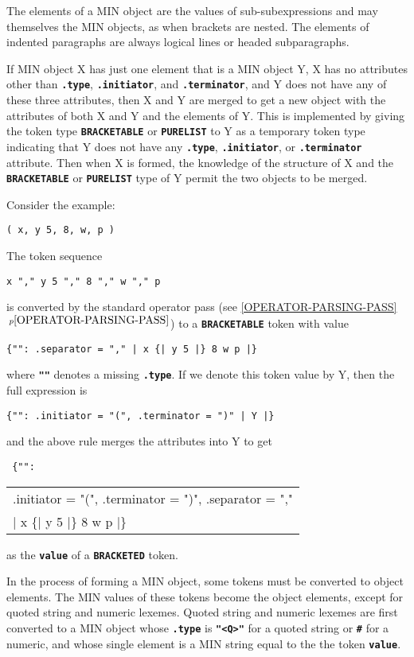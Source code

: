 \documentclass[12pt]{article}
\newcommand{\TT}[1]{{\tt \bfseries #1}}
\newcommand{\itemref}[1]{\ref{#1}$\,^{p\pageref{#1}}$}
\begin{document}
The elements of a MIN object are the values of sub-subexpressions and
may themselves the MIN objects, as when brackets are nested.  The
elements of indented paragraphs are always logical lines or
headed subparagraphs.

If MIN object X has just one element that is a MIN object Y,
X has no attributes other than \TT{.type}, \TT{.initiator},
and \TT{.terminator}, and Y does not have any of these three
attributes, then X and Y are merged to get a new object with
the attributes of both X and Y and the elements of Y.  This is implemented
by giving the token type
\TT{BRACKETABLE} or \TT{PURELIST}
to Y as a temporary token type indicating that Y
does not have any \TT{.type}, \TT{.initiator}, or \TT{.terminator}
attribute.  Then when X is formed, the knowledge of the structure
of X and the \TT{BRACKETABLE} or \TT{PURELIST} type of Y permit the two objects
to be merged.%
\label{MERGING-BRACKETABLE-TOKENS}

Consider the example:
\begin{center}
\tt ( x, y 5, 8, w, p )
\end{center}

The token sequence
\begin{center}
\tt x "," y 5 "," 8 "," w "," p
\end{center}
is converted by the standard operator pass
(see \itemref{OPERATOR-PARSING-PASS})
to a \TT{BRACKETABLE} token with value
\begin{center}
\tt \{"": .separator = "," | x  \{| y 5 |\} 8 w p |\}
\end{center}
where \TT{""} denotes a missing \TT{.type}.
If we denote this token value by Y,
then the full expression is
\begin{center}
\tt \{"": .initiator = "(", .terminator = ")" | Y |\}
\end{center}
and the above rule merges the attributes into Y to get
\begin{center}
\tt
\{"": \begin{tabular}[t]{l}
      .initiator = "(", .terminator = ")", .separator = "," \\
      | x  \{| y 5 |\} 8 w p |\}
      \end{tabular}
\end{center}
as the \TT{value} of a \TT{BRACKETED} token.

In the process of forming a MIN object, some tokens must be converted to
object elements.  The MIN values of these tokens become the object elements,
except for quoted string and numeric lexemes.
Quoted string and numeric lexemes
are first converted to a MIN object
whose \TT{.type} is \TT{"<Q>"} for a quoted string or \TT{\#} for
a numeric, and whose single element is a MIN string equal to the
the token \TT{value}.
\end{document}
